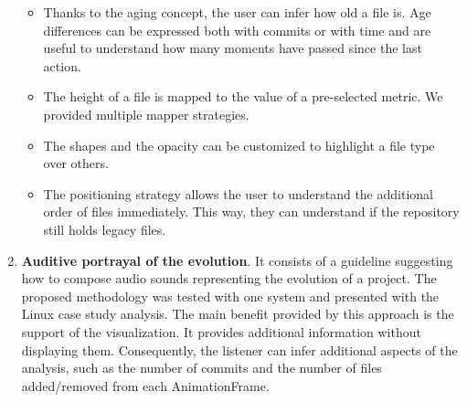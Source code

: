 \begin{enumerate}
\begin{itemize}
        \item Thanks to the aging concept, the user can infer how old a file is. Age differences can be expressed both with commits or with time and are useful to understand how many moments have passed since the last action.
        \item The height of a file is mapped to the value of a pre-selected metric. We provided multiple mapper strategies. 
        \item The shapes and the opacity can be customized to highlight a file type over others. 
        \item The positioning strategy allows the user to understand the additional order of files immediately. This way, they can understand if the repository still holds legacy files. 
    \end{itemize}
    \item \textbf{Auditive portrayal of the evolution}. It consists of a guideline suggesting how to compose audio sounds representing the evolution of a project. The proposed methodology was tested with one system and presented with the Linux case study analysis. The main benefit provided by this approach is the support of the visualization. It provides additional information without displaying them. Consequently, the listener can infer additional aspects of the analysis, such as the number of commits and the number of files added/removed from each AnimationFrame.  
\end{enumerate}

